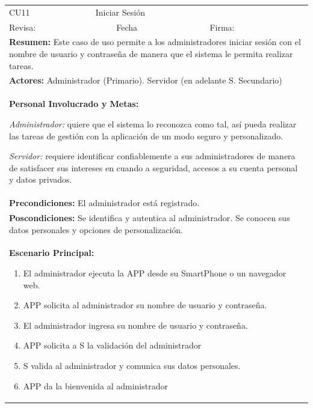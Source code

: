 \begin{longtable}{|l|p{5.5cm}|l|p{2cm}|l|p{1.9cm}|} \hline
    \cellcolor{grisOscuro} CU11 & \multicolumn{4}{|l|}{  \cellcolor{grisOscuro} Iniciar Sesión} &  \cellcolor{grisClaro}\multirow{2}{1cm}{} \\ \cline{1-5}
    \cellcolor{grisOscuro} Revisa: &  \cellcolor{grisClaro} &  \cellcolor{grisOscuro} Fecha &  \cellcolor{grisClaro} &  \cellcolor{grisOscuro} Firma: & \cellcolor{grisClaro} \\ \hline
    \multicolumn{6}{|p{15cm}|}{ \textbf{Resumen: } Este caso de uso permite a los administradores iniciar sesión con el nombre de usuario y contraseña de manera que el sistema le permita realizar tareas.

    } \\ \hline

    \multicolumn{6}{|p{15cm}|}{ \textbf{Actores: } Administrador (Primario). Servidor (en adelante S. Secundario)

    } \\ \hline

    \multicolumn{6}{|p{15cm}|}{ \textbf{Personal Involucrado y Metas: }

    \emph{Administrador:} quiere que el sistema lo reconozca como tal, así pueda realizar las tareas de gestión con la aplicación de un modo seguro y personalizado.

    \emph{Servidor:} requiere identificar confiablemente a sus administradores de manera de satisfacer sus intereses en cuando a seguridad, accesos a su cuenta personal y datos privados.

    } \\ \hline

    \multicolumn{6}{|p{15cm}|}{ \textbf{Precondiciones: } El administrador está registrado.

    } \\ \hline

    \multicolumn{6}{|p{15cm}|}{ \textbf{Poscondiciones: } Se identifica y autentica al administrador. Se conocen sus datos personales y opciones de personalización.

    } \\ \hline

    \multicolumn{6}{|p{15cm}|}{ \textbf{Escenario Principal: }

    \begin{enumerate}
        \item El administrador ejecuta la APP desde su SmartPhone o un navegador web.
        \item APP solicita al administrador su nombre de usuario y contraseña.
        \item El administrador ingresa su nombre de usuario y contraseña.
        \item APP solicita a S la validación del administrador
        \item S valida al administrador y comunica sus datos personales.
        \item APP da la bienvenida al administrador
    \end{enumerate}

}
\end{longtable}
